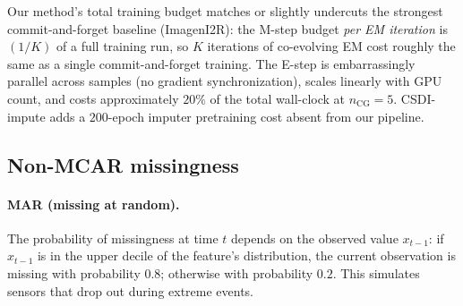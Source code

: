 \documentclass{article}
\theoremstyle{plain}
\theoremstyle{definition}
\theoremstyle{remark}
\begin{document}
\begin{table}[h]
\centering
\caption{Total training wall-clock (Energy $50\%$, single A100). Comparable budgets confirm iteration---not extra compute---is responsible for the quality gain.}
\label{tab:wallclock}
\end{table}

Our method's total training budget matches or slightly undercuts the strongest commit-and-forget baseline (ImagenI2R): the M-step budget \emph{per EM iteration} is $(1/K)$ of a full training run, so $K$ iterations of co-evolving EM cost roughly the same as a single commit-and-forget training. The E-step is embarrassingly parallel across samples (no gradient synchronization), scales linearly with GPU count, and costs approximately $20\%$ of the total wall-clock at $n_{\mathrm{CG}} = 5$. CSDI-impute adds a $200$-epoch imputer pretraining cost absent from our pipeline.

\subsection{Non-MCAR missingness}
\label{app:non-mcar}

\paragraph{MAR (missing at random).}
The probability of missingness at time $t$ depends on the observed value $x_{t-1}$: if $x_{t-1}$ is in the upper decile of the feature's distribution, the current observation is missing with probability $0.8$; otherwise with probability $0.2$. This simulates sensors that drop out during extreme events.
\end{document}

